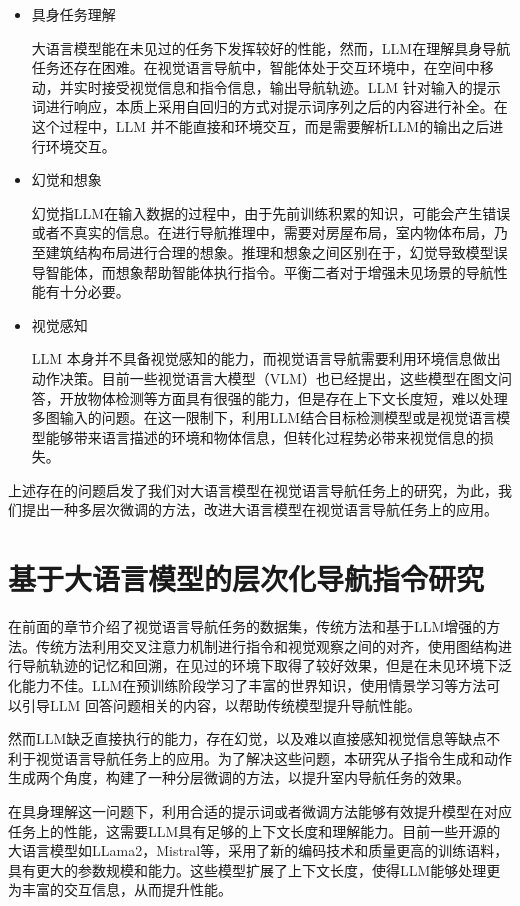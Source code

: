 \documentclass[bachelor]{thesis-uestc}
\begin{document}
\begin{itemize}
    \item 具身任务理解
    
    大语言模型能在未见过的任务下发挥较好的性能，然而，LLM在理解具身导航任务还存在困难。在视觉语言导航中，智能体处于交互环境中，在空间中移动，并实时接受视觉信息和指令信息，输出导航轨迹。LLM 针对输入的提示词进行响应，本质上采用自回归的方式对提示词序列之后的内容进行补全。在这个过程中，LLM 并不能直接和环境交互，而是需要解析LLM的输出之后进行环境交互。

    \item 幻觉和想象
    
    幻觉指LLM在输入数据的过程中，由于先前训练积累的知识，可能会产生错误或者不真实的信息。在进行导航推理中，需要对房屋布局，室内物体布局，乃至建筑结构布局进行合理的想象。推理和想象之间区别在于，幻觉导致模型误导智能体，而想象帮助智能体执行指令。平衡二者对于增强未见场景的导航性能有十分必要。

    \item 视觉感知
    
    LLM 本身并不具备视觉感知的能力，而视觉语言导航需要利用环境信息做出动作决策。目前一些视觉语言大模型（VLM）也已经提出，这些模型在图文问答，开放物体检测等方面具有很强的能力，但是存在上下文长度短，难以处理多图输入的问题。在这一限制下，利用LLM结合目标检测模型或是视觉语言模型能够带来语言描述的环境和物体信息，但转化过程势必带来视觉信息的损失。
\end{itemize}

上述存在的问题启发了我们对大语言模型在视觉语言导航任务上的研究，为此，我们提出一种多层次微调的方法，改进大语言模型在视觉语言导航任务上的应用。

\chapter{基于大语言模型的层次化导航指令研究}

在前面的章节介绍了视觉语言导航任务的数据集，传统方法和基于LLM增强的方法。传统方法利用交叉注意力机制进行指令和视觉观察之间的对齐，使用图结构进行导航轨迹的记忆和回溯，在见过的环境下取得了较好效果，但是在未见环境下泛化能力不佳。LLM在预训练阶段学习了丰富的世界知识，使用情景学习等方法可以引导LLM 回答问题相关的内容，以帮助传统模型提升导航性能。

然而LLM缺乏直接执行的能力，存在幻觉，以及难以直接感知视觉信息等缺点不利于视觉语言导航任务上的应用。为了解决这些问题，本研究从子指令生成和动作生成两个角度，构建了一种分层微调的方法，以提升室内导航任务的效果。

在具身理解这一问题下，利用合适的提示词或者微调方法能够有效提升模型在对应任务上的性能，这需要LLM具有足够的上下文长度和理解能力。目前一些开源的大语言模型如LLama2\cite{touvronLlamaOpenFoundation2023}，Mistral\cite{jiang2023mistral}等，采用了新的编码技术和质量更高的训练语料，具有更大的参数规模和能力。这些模型扩展了上下文长度，使得LLM能够处理更为丰富的交互信息，从而提升性能。
\end{document}
